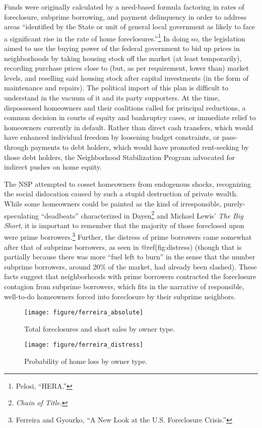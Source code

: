 \documentclass[
]{article}
\let\rmarkdownfootnote\footnote%
\def\footnote{\protect\rmarkdownfootnote}
\begin{document}
Funds were originally calculated by a need-based formula factoring in
rates of foreclosure, subprime borrowing, and payment delinquency in
order to address areas ``identified by the State or unit of general
local government as likely to face a significant rise in the rate of
home foreclosures.''\footnote{Pelosi, ``HERA.''} In doing so, the
legislation aimed to use the buying power of the federal government to
bid up prices in neighborhoods by taking housing stock off the market
(at least temporarily), recording purchase prices close to (but, as per
requirement, lower than) market levels, and reselling said housing stock
after capital investments (in the form of maintenance and repairs). The
political import of this plan is difficult to understand in the vacuum
of it and its party supporters. At the time, dispossessed homeowners and
their coalitions called for principal reductions, a common decision in
courts of equity and bankruptcy cases, or immediate relief to homeowners
currently in default. Rather than direct cash transfers, which would
have enhanced individual freedom by loosening budget constraints, or
pass-through payments to debt holders, which would have promoted
rent-seeking by those debt holders, the Neighborhood Stabilization
Program advocated for indirect pushes on home equity.

The NSP attempted to cosset homeowners from endogenous shocks,
recognizing the social dislocation caused by such a stupid destruction
of private wealth. While some homeowners could be painted as the kind of
irresponsible, purely-speculating ``deadbeats'' characterized in
Dayen\footnote{\emph{Chain of Title}.} and Michael Lewis' \emph{The Big
Short}, it is important to remember that the majority of those
foreclosed upon were prime borrowers.\footnote{Ferreira and Gyourko, ``A
  New Look at the U.S. Foreclosure Crisis.''} Further, the distress of
prime borrowers came somewhat after that of subprime borrowers, as seen
in @ref(fig:distress) (though that is partially because there was more
``fuel left to burn'' in the sense that the number subprime borrowers,
around 20\% of the market, had already been slashed). These facts
suggest that neighborhoods with prime borrowers contracted the
foreclosure contagion from subprime borrowers, which fits in the
narrative of responsible, well-to-do homeowners forced into foreclosure
by their subprime neighbors.

\begin{figure}

{\centering \texttt{[image: figure/ferreira\_absolute]}

}

\caption{Total foreclosures and short sales by owner type.}\label{fig:distress1}
\end{figure}
\begin{figure}

{\centering \texttt{[image: figure/ferreira\_distress]}

}

\caption{Probability of home loss by owner type.}\label{fig:distress2}
\end{figure}
\end{document}
